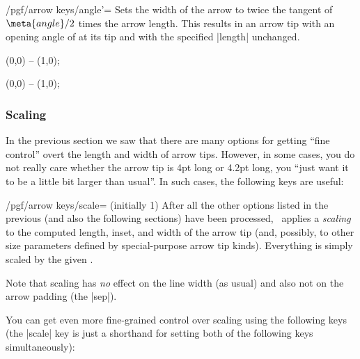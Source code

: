 \begin{key}{/pgf/arrow keys/angle'=}
    Sets the width of the arrow to twice the tangent of $\meta{angle}/2$ times
    the arrow length. This results in an arrow tip with an opening angle of
     at its tip and with the specified |length| unchanged.
\begin{codeexample}[preamble={\usetikzlibrary{arrows.meta}}]
\tikz \draw [arrows = {-Stealth[inset=0pt, length=10pt, angle'=90]}]
            (0,0) -- (1,0);
\end{codeexample}
\begin{codeexample}[preamble={\usetikzlibrary{arrows.meta}}]
\tikz \draw [arrows = {-Stealth[inset=0pt, length=10pt, angle'=30]}]
            (0,0) -- (1,0);
\end{codeexample}
\end{key}


\subsubsection{Scaling}

In the previous section we saw that there are many options for getting ``fine
control'' overt the length and width of arrow tips. However, in some cases, you
do not really care whether the arrow tip is 4pt long or 4.2pt long, you ``just
want it to be a little bit larger than usual''. In such cases, the following
keys are useful:

\begin{key}{/pgf/arrow keys/scale= (initially 1)}
    After all the other options listed in the previous (and also the following
    sections) have been processed, \tikzname\ applies a \emph{scaling} to the
    computed length, inset, and width of the arrow tip (and, possibly, to other
    size parameters defined by special-purpose arrow tip kinds). Everything is
    simply scaled by the given .
\begin{codeexample}[preamble={\usetikzlibrary{arrows.meta}}]
\end{codeexample}
    Note that scaling has \emph{no} effect on the line width (as usual) and
    also not on the arrow padding (the |sep|).
\end{key}

You can get even more fine-grained control over scaling using the following
keys (the |scale| key is just a shorthand for setting both of the following
keys simultaneously):

